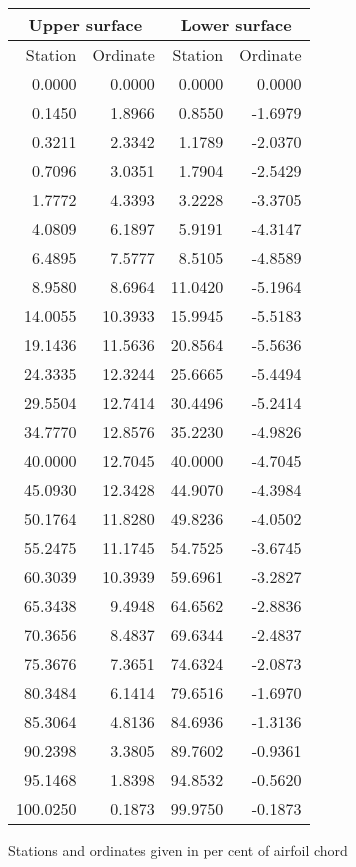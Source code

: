 \documentclass[11pt]{book}
\begin{document}
 \hspace{4mm}
 \begin{tabular}{|r|r|r|r|} \hline 
 \multicolumn{2}{|c|}{Upper surface} & \multicolumn{2}{|c|}{Lower surface} \\
 \hline
 Station & Ordinate & Station & Ordinate \\
 \hline
0.0000 & 0.0000 & 0.0000 & 0.0000 \\
0.1450 & 1.8966 & 0.8550 & -1.6979 \\
0.3211 & 2.3342 & 1.1789 & -2.0370 \\
0.7096 & 3.0351 & 1.7904 & -2.5429 \\
1.7772 & 4.3393 & 3.2228 & -3.3705 \\
4.0809 & 6.1897 & 5.9191 & -4.3147 \\
6.4895 & 7.5777 & 8.5105 & -4.8589 \\
8.9580 & 8.6964 & 11.0420 & -5.1964 \\
14.0055 & 10.3933 & 15.9945 & -5.5183 \\
19.1436 & 11.5636 & 20.8564 & -5.5636 \\
24.3335 & 12.3244 & 25.6665 & -5.4494 \\
29.5504 & 12.7414 & 30.4496 & -5.2414 \\
34.7770 & 12.8576 & 35.2230 & -4.9826 \\
40.0000 & 12.7045 & 40.0000 & -4.7045 \\
45.0930 & 12.3428 & 44.9070 & -4.3984 \\
50.1764 & 11.8280 & 49.8236 & -4.0502 \\
55.2475 & 11.1745 & 54.7525 & -3.6745 \\
60.3039 & 10.3939 & 59.6961 & -3.2827 \\
65.3438 & 9.4948 & 64.6562 & -2.8836 \\
70.3656 & 8.4837 & 69.6344 & -2.4837 \\
75.3676 & 7.3651 & 74.6324 & -2.0873 \\
80.3484 & 6.1414 & 79.6516 & -1.6970 \\
85.3064 & 4.8136 & 84.6936 & -1.3136 \\
90.2398 & 3.3805 & 89.7602 & -0.9361 \\
95.1468 & 1.8398 & 94.8532 & -0.5620 \\
100.0250 & 0.1873 & 99.9750 & -0.1873 \\
 \hline 
 \end{tabular}
 \vspace{8mm}

Stations and ordinates given in per cent of airfoil chord
\end{document}
